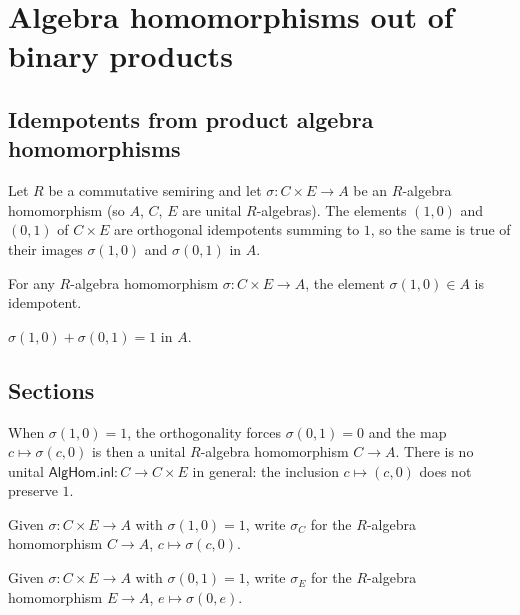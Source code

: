 \chapter{Algebra homomorphisms out of binary products}
\label{ch:mathlib-algebra-prod}

\section{Idempotents from product algebra homomorphisms}

Let $R$ be a commutative semiring and let $\sigma : C \times E \to A$ be an
$R$-algebra homomorphism (so $A$, $C$, $E$ are unital $R$-algebras). The
elements $(1, 0)$ and $(0, 1)$ of $C \times E$ are orthogonal idempotents
summing to $1$, so the same is true of their images $\sigma(1, 0)$ and
$\sigma(0, 1)$ in $A$.

\begin{lemma}
  \label{lem:apply-inl-idempotent}
  \leanok
  For any $R$-algebra homomorphism $\sigma : C \times E \to A$,
  the element $\sigma(1, 0) \in A$ is idempotent.
\end{lemma}

\begin{lemma}
  \label{lem:apply-inl-add-apply-inr}
  \leanok
  $\sigma(1, 0) + \sigma(0, 1) = 1$ in $A$.
\end{lemma}

\section{Sections}

When $\sigma(1, 0) = 1$, the orthogonality forces $\sigma(0, 1) = 0$ and the
map $c \mapsto \sigma(c, 0)$ is then a unital $R$-algebra homomorphism
$C \to A$. There is no unital \(\textsf{AlgHom.inl} : C \to C \times E\) in
general: the inclusion $c \mapsto (c, 0)$ does not preserve $1$.

\begin{definition}
  \label{def:compFstSection}
  \leanok
  Given $\sigma : C \times E \to A$ with $\sigma(1, 0) = 1$, write
  $\sigma_C$ for the $R$-algebra homomorphism $C \to A$, $c \mapsto \sigma(c, 0)$.
\end{definition}

\begin{definition}
  \label{def:compSndSection}
  \leanok
  Given $\sigma : C \times E \to A$ with $\sigma(0, 1) = 1$, write
  $\sigma_E$ for the $R$-algebra homomorphism $E \to A$, $e \mapsto \sigma(0, e)$.
\end{definition}

